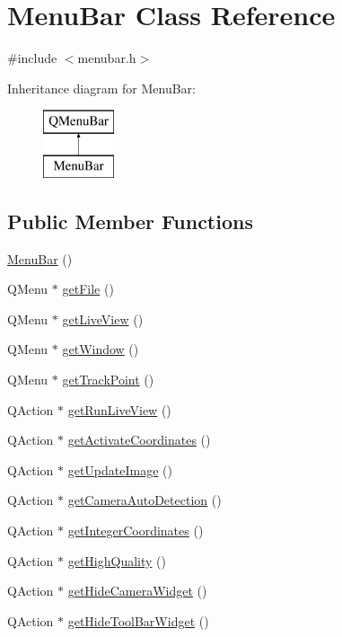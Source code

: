 \hypertarget{class_menu_bar}{}\section{Menu\+Bar Class Reference}
\label{class_menu_bar}


{\ttfamily \#include $<$menubar.\+h$>$}

Inheritance diagram for Menu\+Bar\+:\begin{figure}[H]
\begin{center}
\leavevmode
\includegraphics[height=2.000000cm]{class_menu_bar}
\end{center}
\end{figure}
\subsection*{Public Member Functions}
\begin{DoxyCompactItemize}
\item 
\mbox{\hyperlink{class_menu_bar_a76a0ec8b0b4cba2775fa71e1791efc6d}{Menu\+Bar}} ()
\item 
Q\+Menu $\ast$ \mbox{\hyperlink{class_menu_bar_a7bbea557f2be53d51cf4bdd8d05cf69b}{get\+File}} ()
\item 
Q\+Menu $\ast$ \mbox{\hyperlink{class_menu_bar_a76f93e93d4ffef1ad344cf94a78daddd}{get\+Live\+View}} ()
\item 
Q\+Menu $\ast$ \mbox{\hyperlink{class_menu_bar_a3054783db94c3d09f6fad6c0305a995b}{get\+Window}} ()
\item 
Q\+Menu $\ast$ \mbox{\hyperlink{class_menu_bar_a85c0c7e40d4caed15743334cb140504f}{get\+Track\+Point}} ()
\item 
Q\+Action $\ast$ \mbox{\hyperlink{class_menu_bar_a35380bc71e90a3e8388443b78237841d}{get\+Run\+Live\+View}} ()
\item 
Q\+Action $\ast$ \mbox{\hyperlink{class_menu_bar_a94443012aa7f65228a4bb3ab1b467be3}{get\+Activate\+Coordinates}} ()
\item 
Q\+Action $\ast$ \mbox{\hyperlink{class_menu_bar_a6142d743b852d8adde210069dffad316}{get\+Update\+Image}} ()
\item 
Q\+Action $\ast$ \mbox{\hyperlink{class_menu_bar_ac22a4356d45b5b117a62903ee7484114}{get\+Camera\+Auto\+Detection}} ()
\item 
Q\+Action $\ast$ \mbox{\hyperlink{class_menu_bar_ae18577d25e042483212efebee94a166e}{get\+Integer\+Coordinates}} ()
\item 
Q\+Action $\ast$ \mbox{\hyperlink{class_menu_bar_a3dfab36f8b07cb9040b3f52a87b361c2}{get\+High\+Quality}} ()
\item 
Q\+Action $\ast$ \mbox{\hyperlink{class_menu_bar_aed94bbd0fafcbedc698ea5ad7a52f923}{get\+Hide\+Camera\+Widget}} ()
\item 
Q\+Action $\ast$ \mbox{\hyperlink{class_menu_bar_a141d5a8fe312d3989b1f15ee60cff0d7}{get\+Hide\+Tool\+Bar\+Widget}} ()
\end{DoxyCompactItemize}


